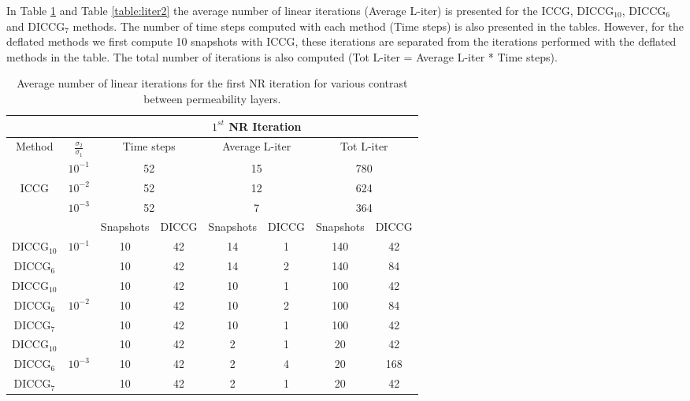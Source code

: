 \documentclass[12pt]{article}
\numberwithin{equation}{section}
\begin{document}
In Table \ref{table:liter1} and Table \ref{table:liter2} the average number of linear iterations (Average L-iter) is presented for the ICCG, DICCG$_{10}$, DICCG$_6$ and DICCG$_7$ methods. The number of time steps computed with each method (Time steps) is also presented in the tables. However, for the deflated methods we first compute 10 snapshots with ICCG, these iterations are separated from the iterations performed with the deflated methods in the table. The total number of iterations is also computed (Tot L-iter = Average L-iter * Time steps). 
\begin{table}[!ht]\centering
\begin{minipage}{1\textwidth}
\vspace{-10pt}
\centering
\begin{tabular}{ |c|c|c|c|c|c|c|c|} 
  \hline
 & & \multicolumn{6}{|c|}{$1^{st}$ NR Iteration}  \\
\hline
Method& $\frac{\sigma_2}{\sigma_1}$ & \multicolumn{2}{|c|}{Time steps} &\multicolumn{2}{|c|}{Average L-iter} & \multicolumn{2}{|c|}{Tot L-iter}\\
\hline
&$10^{-1}$ &\multicolumn{2}{|c|}{52} & \multicolumn{2}{|c|}{15}& \multicolumn{2}{|c|}{780} \\
ICCG&$10^{-2}$ & \multicolumn{2}{|c|}{52}& \multicolumn{2}{|c|}{12}& \multicolumn{2}{|c|}{624}\\
&$10^{-3}$ & \multicolumn{2}{|c|}{52} &\multicolumn{2}{|c|}{7} & \multicolumn{2}{|c|}{364}\\
\hline
&&Snapshots&DICCG&Snapshots&DICCG&Snapshots&DICCG\\
\hline
DICCG$_{10}$&$10^{-1}$ &10&42 &14&1 &140&42 \\
DICCG$_6$& &10&42 &14&2 &140&84 \\
\hline
DICCG$_{10}$& &10&42 & 10&1& 100&42\\
DICCG$_6$&$10^{-2}$ &10&42 & 10&2& 100&84\\
DICCG$_7$& &10&42 & 10&1& 100&42\\
\hline
DICCG$_{10}$& & 10&42 & 2&1&20&42 \\
DICCG$_6$&$10^{-3}$ & 10&42 & 2&4&20&168 \\
DICCG$_7$& & 10&42 & 2&1&20&42 \\
 \hline
 \end{tabular}
\caption{Average number of linear iterations for the first NR iteration for various contrast between permeability layers. }\label{table:liter1}
\end{minipage}
\end{table}
\end{document}
